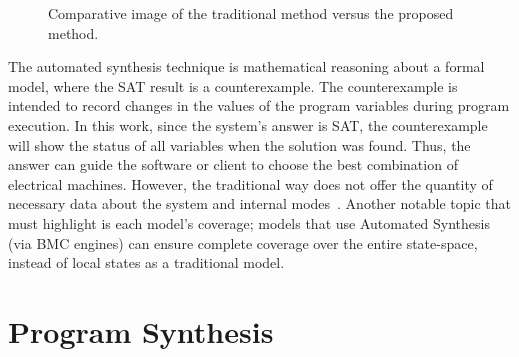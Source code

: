 \documentclass[journal]{IEEEtran}
\begin{document}
\begin{figure}[ht]
\begin{center}
\end{center}
\caption{Comparative image of the traditional method versus the proposed method.}
\label{fig:optimization}
\end{figure}
  
The automated synthesis technique is mathematical reasoning about a formal model, where the SAT result is a counterexample. The counterexample is intended to record changes in the values of the program variables during program execution. In this work, since the system's answer is SAT, the counterexample will show the status of all variables when the solution was found. Thus, the answer can guide the software or client to choose the best combination of electrical machines. However, the traditional way does not offer the quantity of necessary data about the system and internal modes~\cite{Benatiallah2017,Pradhan,Swarnkar}. Another notable topic that must highlight is each model's coverage; models that use Automated Synthesis (via BMC engines) can ensure complete coverage over the entire state-space, instead of local states as a traditional model.

\section{Program Synthesis}
\end{document}
